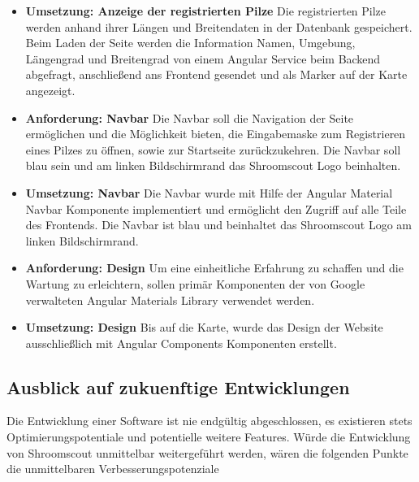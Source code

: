 \documentclass[../main.tex]{subfiles}
\begin{document}
\begin{itemize}
	\item \textbf{Umsetzung: Anzeige der registrierten Pilze}
		  Die registrierten Pilze werden anhand ihrer Längen und Breitendaten in der Datenbank gespeichert.
          Beim Laden der Seite werden die Information Namen, Umgebung, Längengrad und Breitengrad von einem Angular Service beim Backend abgefragt, anschließend ans Frontend gesendet
          und als Marker auf der Karte angezeigt.

	\item \textbf{Anforderung: Navbar}
	      Die Navbar soll die Navigation der Seite ermöglichen und die Möglichkeit bieten, die Eingabemaske zum Registrieren eines Pilzes zu öffnen, sowie zur Startseite zurückzukehren.
		  Die Navbar soll blau sein und am linken Bildschirmrand das Shroomscout Logo beinhalten.

    \item \textbf{Umsetzung: Navbar}
	      Die Navbar wurde mit Hilfe der Angular Material Navbar Komponente implementiert und ermöglicht den Zugriff auf alle Teile des Frontends.
          Die Navbar ist blau und beinhaltet das Shroomscout Logo am linken Bildschirmrand.

	\item \textbf{Anforderung: Design}
	      Um eine einheitliche Erfahrung zu schaffen und die Wartung zu erleichtern, sollen primär Komponenten der von Google verwalteten Angular Materials Library verwendet werden.

    \item \textbf{Umsetzung: Design}
          Bis auf die Karte, wurde das Design der Website ausschließlich mit Angular Components Komponenten erstellt.
\end{itemize}

\subsubsection{}

\subsection{Ausblick auf zukuenftige Entwicklungen}
Die Entwicklung einer Software ist nie endgültig abgeschlossen, es existieren stets Optimierungspotentiale und potentielle weitere Features.
Würde die Entwicklung von Shroomscout unmittelbar weitergeführt werden, wären die folgenden Punkte die unmittelbaren Verbesserungspotenziale
\end{document}
